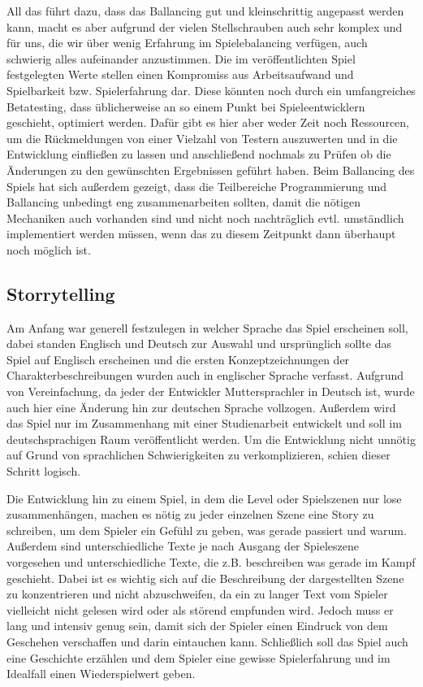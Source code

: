 All das führt dazu, dass das Ballancing gut und kleinschrittig angepasst werden kann, macht es aber aufgrund der vielen Stellschrauben auch sehr komplex und für uns, die wir über wenig Erfahrung im Spielebalancing verfügen, auch schwierig alles aufeinander anzustimmen. Die im veröffentlichten Spiel festgelegten Werte stellen einen Kompromiss aus Arbeitsaufwand und Spielbarkeit bzw. Spielerfahrung dar. Diese könnten noch durch ein umfangreiches Betatesting, dass üblicherweise an so einem Punkt bei Spieleentwicklern geschieht, optimiert werden. Dafür gibt es hier aber weder Zeit noch Ressourcen, um die Rückmeldungen von einer Vielzahl von Testern auszuwerten und in die Entwicklung einfließen zu lassen und anschließend nochmals zu Prüfen ob die Änderungen zu den gewünschten Ergebnissen geführt haben. Beim Ballancing des Spiels hat sich außerdem gezeigt, dass die Teilbereiche Programmierung und Ballancing unbedingt eng zusammenarbeiten sollten, damit die nötigen Mechaniken auch vorhanden sind und nicht noch nachträglich evtl. umständlich implementiert werden müssen, wenn das zu diesem Zeitpunkt dann überhaupt noch möglich ist.

\subsection{Storrytelling} Am Anfang war generell festzulegen in welcher Sprache das Spiel erscheinen soll, dabei standen Englisch und Deutsch zur Auswahl und ursprünglich sollte das Spiel auf Englisch erscheinen und die ersten Konzeptzeichnungen der Charakterbeschreibungen wurden auch in englischer Sprache verfasst. Aufgrund von Vereinfachung, da jeder der Entwickler Muttersprachler in Deutsch ist, wurde auch hier eine Änderung hin zur deutschen Sprache vollzogen. Außerdem wird das Spiel nur im Zusammenhang mit einer Studienarbeit entwickelt und soll im deutschsprachigen Raum veröffentlicht werden. Um die Entwicklung nicht unnötig auf Grund von sprachlichen Schwierigkeiten zu verkomplizieren, schien dieser Schritt logisch. 

Die Entwicklung hin zu einem Spiel, in dem die Level oder Spielszenen nur lose zusammenhängen, machen es nötig zu jeder einzelnen Szene eine Story zu schreiben, um dem Spieler ein Gefühl zu geben, was gerade passiert und warum. Außerdem sind unterschiedliche Texte je nach Ausgang der Spieleszene vorgesehen und unterschiedliche Texte, die z.B. beschreiben was gerade im Kampf geschieht. Dabei ist es wichtig sich auf die Beschreibung der dargestellten Szene zu konzentrieren und nicht abzuschweifen, da ein zu langer Text vom Spieler vielleicht nicht gelesen wird oder als störend empfunden wird. Jedoch muss er lang und intensiv genug sein, damit sich der Spieler einen Eindruck von dem Geschehen verschaffen und darin eintauchen kann. Schließlich soll das Spiel auch eine Geschichte erzählen und dem Spieler eine gewisse Spielerfahrung und im Idealfall einen Wiederspielwert geben. 

